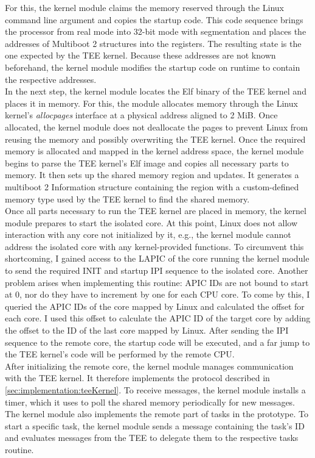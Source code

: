 For this, the kernel module claims the memory reserved through the Linux command
line argument and copies the startup code. This code sequence brings the
processor from real mode into 32-bit mode with segmentation and places the
addresses of Multiboot 2 structures into the registers. The resulting state is
the one expected by the TEE kernel. Because these addresses are not known
beforehand, the kernel module modifies the startup code on runtime to contain
the respective addresses.\\

In the next step, the kernel module locates the Elf binary of the TEE kernel and
places it in memory. For this, the module allocates memory through the Linux
kernel's \textit{allocpages} interface at a physical address aligned to 2 MiB.
Once allocated, the kernel module does not deallocate the pages to prevent Linux
from reusing the memory and possibly overwriting the TEE kernel. Once the
required memory is allocated and mapped in the kernel address space, the kernel
module begins to parse the TEE kernel's Elf image and copies all necessary parts
to memory. It then sets up the shared memory region and updates. It generates a
multiboot 2 Information structure containing the region with a custom-defined
memory type used by the TEE kernel to find the shared memory.\\

Once all parts necessary to run the TEE kernel are placed in memory, the kernel
module prepares to start the isolated core. At this point, Linux does not allow
interaction with any core not initialized by it, e.g., the kernel module cannot
address the isolated core with any kernel-provided functions. To circumvent this
shortcoming, I gained access to the LAPIC of the core running the kernel module
to send the required INIT and startup IPI sequence to the isolated core. Another
problem arises when implementing this routine: APIC IDs are not bound to start
at 0, nor do they have to increment by one for each CPU core. To come by this, I
queried the APIC IDs of the core mapped by Linux and calculated the offset for
each core. I used this offset to calculate the APIC ID of the target core by
adding the offset to the ID of the last core mapped by Linux. After sending the
IPI sequence to the remote core, the startup code will be executed, and a far
jump to the TEE kernel's code will be performed by the remote CPU.\\

After initializing the remote core, the kernel module manages communication with
the TEE kernel. It therefore implements the protocol described in
\ref{sec:implementation:teeKernel}. To receive messages, the kernel module
installs a timer, which it uses to poll the shared memory periodically for new
messages. The kernel module also implements the remote part of tasks in the
prototype. To start a specific task, the kernel module sends a message
containing the task's ID and evaluates messages from the TEE to delegate them to
the respective tasks routine. \\

